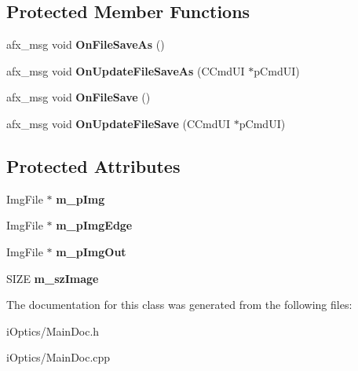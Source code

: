\subsection*{Protected Member Functions}
\begin{DoxyCompactItemize}
\item 
\mbox{\label{class_c_main_doc_a8213ee6e6cc2362c108a23397deaea75}} 
afx\+\_\+msg void {\bfseries On\+File\+Save\+As} ()
\item 
\mbox{\label{class_c_main_doc_afd3859fa6725882b108930ba060b1b52}} 
afx\+\_\+msg void {\bfseries On\+Update\+File\+Save\+As} (C\+Cmd\+UI $\ast$p\+Cmd\+UI)
\item 
\mbox{\label{class_c_main_doc_a367feb33c52af2fba6684b052b5a5d37}} 
afx\+\_\+msg void {\bfseries On\+File\+Save} ()
\item 
\mbox{\label{class_c_main_doc_a25b7cad95cf95daa5a9028ebcf323ddf}} 
afx\+\_\+msg void {\bfseries On\+Update\+File\+Save} (C\+Cmd\+UI $\ast$p\+Cmd\+UI)
\end{DoxyCompactItemize}
\subsection*{Protected Attributes}
\begin{DoxyCompactItemize}
\item 
\mbox{\label{class_c_main_doc_a5c68f04aec7608ec7be0443e244a2438}} 
Img\+File $\ast$ {\bfseries m\+\_\+p\+Img}
\item 
\mbox{\label{class_c_main_doc_a2ed43e97d3248881e178d69647aebdde}} 
Img\+File $\ast$ {\bfseries m\+\_\+p\+Img\+Edge}
\item 
\mbox{\label{class_c_main_doc_a49074efdff7dc3cbdfd460bea387a05b}} 
Img\+File $\ast$ {\bfseries m\+\_\+p\+Img\+Out}
\item 
\mbox{\label{class_c_main_doc_a194f4b9748851f84b9cd018f3aa9a363}} 
S\+I\+ZE {\bfseries m\+\_\+sz\+Image}
\end{DoxyCompactItemize}


The documentation for this class was generated from the following files\+:\begin{DoxyCompactItemize}
\item 
i\+Optics/Main\+Doc.\+h\item 
i\+Optics/Main\+Doc.\+cpp\end{DoxyCompactItemize}
